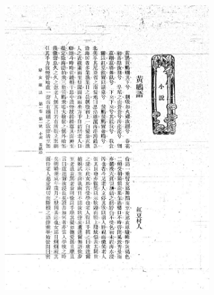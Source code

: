 \documentclass{beamer}
\begin{document}
\begin{frame}
\begin{figure}[htbp]
\begin{subfigure}[b]{0.23\linewidth}
            \includegraphics[height=1.3\linewidth]{./figures/fnzz2}
        \end{subfigure}
        \hfill
        \begin{subfigure}[b]{0.23\linewidth}

\end{subfigure}
\end{figure}
\end{frame}
\end{document}
